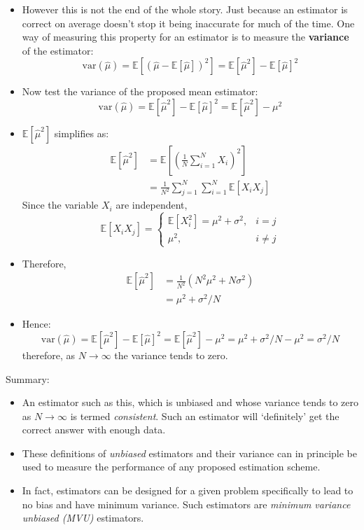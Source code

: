\documentclass[12pt]{article}
\newcommand{\titc}[1]{\textit{\textcolor{blue1}{#1}}}
\newcommand{\sigd}{\sigma^2}
\newcommand{\var}{\textrm{var}}
\newcommand{\mexp}{\mathbb{E}}
\newcommand{\pmean}{\hat{\mu}}
\begin{document}
\begin{itemize}

    \item However this is not the end of the whole story. Just because an estimator is correct on average doesn't stop it being inaccurate for much of the time. One way of measuring this property for an estimator is to measure the \textbf{variance} of the estimator:
    \[
    \var(\hat{\mu}) = \mexp[(\pmean - \mexp[\pmean])^2] = \mexp[\pmean^2] - \mexp[\pmean]^2
    \]
    \item Now test the variance of the proposed mean estimator:
    \[
    \var(\pmean) = \mexp[\pmean^2] - \mexp[\pmean]^2 = \mexp[\pmean^2] - \mu^2
    \]
    \item $\mexp[\pmean^2]$ simplifies as: 
    \begin{align*}
        \mexp[\pmean^2] &= \mexp\left[\left(\frac{1}{N} \sum_{i=1}^N X_i\right)^2 \right] \\
        & = \frac{1}{N^2} \sum_{j=1}^N \sum_{i=1}^N \mexp[X_i X_j]
    \end{align*}
    Since the variable $X_i$ are independent,
    \[
    \mexp[X_i X_j] = \left\{\begin{array}{ll}
        \mexp[X_i^2]=\mu^2 + \sigd ,  & i=j \\
        \mu^2 , & i \not = j
    \end{array}\right.
    \]
    \item Therefore,
    \begin{align*}
        \mexp[\pmean^2] &= \frac{1}{N^2} (N^2 \mu^2 + N \sigd) \\
        &= \mu^2 + \sigd / N
    \end{align*}
    \item Hence:
    \[
    \var(\pmean) = \mexp[\pmean^2] - \mexp[\pmean]^2 = \mexp[\pmean^2] - \mu^2 = \mu^2 + \sigd / N - \mu^2 = \sigd / N
    \]
    therefore, as $N \rightarrow \infty$ the variance tends to zero.
\end{itemize}
Summary:
\begin{itemize}
    \item An estimator such as this, which is unbiased and whose variance tends to zero as $N \rightarrow \infty$ is termed \titc{consistent}. Such an estimator will `definitely' get the correct answer with enough data.
    \item These definitions of \titc{unbiased} estimators and their variance can in principle be used to measure the performance of any proposed estimation scheme.
    \item In fact, estimators can be designed for a given problem specifically to lead to no bias and have minimum variance. Such estimators are \titc{minimum variance unbiased (MVU)} estimators.
\end{itemize}
\end{document}
